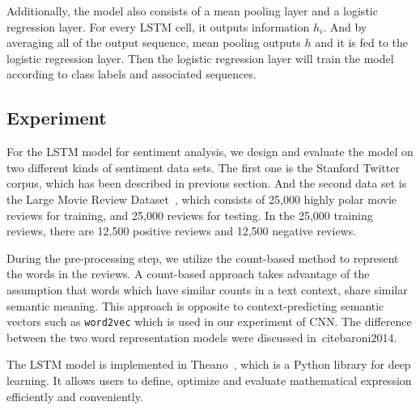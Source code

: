 Additionally, the model also consists of a mean pooling layer and a logistic regression layer. For every LSTM cell, it outputs information $h_i$. And by averaging all of the output sequence, mean pooling outputs $h$ and it is fed to the logistic regression layer. Then the logistic regression layer will train the model according to class labels and associated sequences.

\subsection{Experiment}
For the LSTM model for sentiment analysis, we design and evaluate the model on two different kinds of sentiment data sets. The first one is the Stanford Twitter corpus, which has been described in previous section. And the second data set is the Large Movie Review Dataset~\cite{maas2011}, which consists of 25,000 highly polar movie reviews for training, and 25,000 reviews for testing. In the 25,000 training reviews, there are 12,500 positive reviews and 12,500 negative reviews.

During the pre-processing step, we utilize the count-based method to represent the words in the reviews. A count-based approach takes advantage of the assumption that words which have similar counts in a text context, share similar semantic meaning. This approach is opposite to context-predicting semantic vectors such as {\tt word2vec} which is used in our experiment of CNN. The difference between the two word representation models were discussed in~cite{baroni2014}. 

The LSTM model is implemented in Theano~\cite{bastien2012, bergstra2010}, which is a Python library for deep learning. It allows users to define, optimize and evaluate mathematical expression efficiently and conveniently. 
